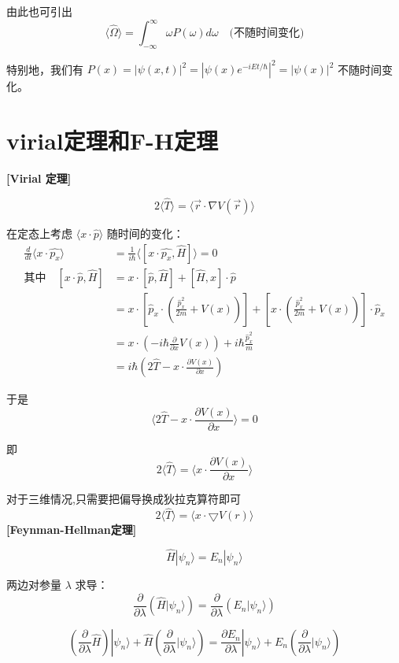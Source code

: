 \documentclass[lang=cn,15pt]{elegantbook}
\begin{document}
\begin{enumerate}
	由此也可引出
	\[
	\langle \hat{\Omega} \rangle = \int_{-\infty}^{\infty} \omega P(\omega) d\omega \quad \text{(不随时间变化)}
	\]
	
	特别地，我们有 $P(x) = |\psi(x,t)|^2 = |\psi(x) e^{-iEt/\hbar}|^2 = |\psi(x)|^2$ 不随时间变化。
\end{enumerate}
\section{virial定理和F-H定理}

\textbf{[Virial 定理]}

\[ 2 \langle \hat{T} \rangle = \langle \vec{r} \cdot \nabla V(\vec{r}) \rangle \]

在定态上考虑 \(\langle x \cdot \hat{p} \rangle\) 随时间的变化：
\begin{align*}
	\frac{d}{dt} \langle x \cdot \hat{p_x} \rangle &= \frac{1}{i\hbar} \langle [x \cdot \hat{p_x}, \hat{H}] \rangle = 0 \\
	\text{其中} \quad [x \cdot \hat{p}, \hat{H}] &= x \cdot [\hat{p}, \hat{H}] + [\hat{H}, x] \cdot \hat{p} \\
	&= x \cdot \left[ \hat{p}_x \cdot \left( \frac{\hat{p}_x^2}{2m} + V(x) \right) \right] + \left[ x \cdot \left( \frac{\hat{p}_x^2}{2m} + V(x) \right) \right] \cdot \hat{p}_x \\
	&= x \cdot \left( -i\hbar \frac{\partial}{\partial x} V(x) \right) + i\hbar \frac{\hat{p}_x^2}{m} \\
	&= i\hbar \left( 2 \hat{T} - x \cdot \frac{\partial V(x)}{\partial x} \right)
\end{align*}

于是
\[ \langle 2 \hat{T} - x \cdot \frac{\partial V(x)}{\partial x} \rangle = 0 \]

即
\[ 2 \langle \hat{T} \rangle = \langle x \cdot \frac{\partial V(x)}{\partial x} \rangle \]

对于三维情况,只需要把偏导换成狄拉克算符即可
\[2\langle \hat{T}\rangle =\langle x\cdot \bigtriangledown V(r)\rangle \]
\textbf{[Feynman-Hellman定理]}

\[
\hat{H} |\psi_n\rangle = E_n |\psi_n\rangle
\]

两边对参量 \(\lambda\) 求导：
\[
\frac{\partial}{\partial \lambda} (\hat{H} |\psi_n\rangle) = \frac{\partial}{\partial \lambda} (E_n |\psi_n\rangle)
\]

\[
\left( \frac{\partial}{\partial \lambda} \hat{H} \right) |\psi_n\rangle + \hat{H} \left( \frac{\partial}{\partial \lambda} |\psi_n\rangle \right) = \frac{\partial E_n}{\partial \lambda} |\psi_n\rangle + E_n \left( \frac{\partial}{\partial \lambda} |\psi_n\rangle \right)
\]
\end{document}
